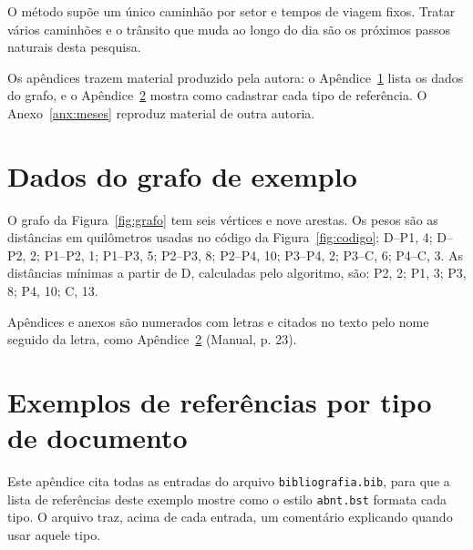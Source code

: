\documentclass[tese,capa]{texufpel}
\begin{document}
O método supõe um único caminhão por setor e tempos de viagem fixos. Tratar
vários caminhões e o trânsito que muda ao longo do dia são os próximos passos
naturais desta pesquisa.

Os apêndices trazem material produzido pela autora: o Apêndice~\ref{apx:dados}
lista os dados do grafo, e o Apêndice~\ref{apx:referencias} mostra como
cadastrar cada tipo de referência. O Anexo~\ref{anx:meses} reproduz material de
outra autoria.




\apendices

\chapter{Dados do grafo de exemplo}
\label{apx:dados}

O grafo da Figura~\ref{fig:grafo} tem seis vértices e nove arestas. Os pesos
são as distâncias em quilômetros usadas no código da
Figura~\ref{fig:codigo}: D--P1, 4; D--P2, 2; P1--P2, 1; P1--P3, 5; P2--P3, 8;
P2--P4, 10; P3--P4, 2; P3--C, 6; P4--C, 3. As distâncias mínimas a partir de
D, calculadas pelo algoritmo, são: P2, 2; P1, 3; P3, 8; P4, 10; C, 13.

Apêndices e anexos são numerados com letras e citados no texto pelo nome
seguido da letra, como Apêndice~\ref{apx:referencias} (Manual, p. 23).

\chapter{Exemplos de referências por tipo de documento}
\label{apx:referencias}

Este apêndice cita todas as entradas do arquivo \texttt{bibliografia.bib},
para que a lista de referências deste exemplo mostre como o estilo
\texttt{abnt.bst} formata cada tipo. O arquivo traz, acima de cada entrada, um
comentário explicando quando usar aquele tipo.
\end{document}
